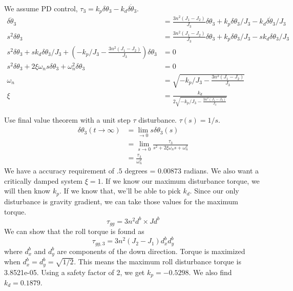 \documentclass[]{article}
\begin{document}
We assume PD control, $\tau_3 = k_p \delta \theta_3 - k_d \delta \dot{\theta}_3$. 
\begin{align}
	\delta \ddot{\theta}_3 & = \frac{3n^2(J_1 - J_2)}{J_3} \delta \theta_3 + k_p \delta \theta_3/J_3 - k_d \delta \dot{\theta}_3/J_3 \\
	s^2 \delta \theta_3 & = \frac{3n^2(J_1 - J_2)}{J_3} \delta \theta_3 + k_p \delta \theta_3/J_3 - s k_d \delta \theta_3/J_3 \\
	s^2 \delta \theta_3 + s k_d \delta \theta_3/J_3 + \left(-k_p/J_3 - \frac{3n^2(J_1 - J_2)}{J_3}\right) \delta \theta_3  & = 0 \\
	s^2 \delta \theta_3 + 2 \xi \omega_n s \delta \theta_3 + \omega_n^2 \delta \theta_3  & = 0 \\
	\omega_n & = \sqrt{-k_p/J_3 - \frac{3n^2(J_1 - J_2)}{J_3}} \\
	\xi & = \frac{k_d}{2 \sqrt{-k_p/J_3 - \frac{3n^2(J_1 - J_2)}{J_3}}}
\end{align}

Use final value theorem with a unit step $\tau$ disturbance. $\tau(s) = 1/s$.
\begin{align}
	\delta \theta_3 (t \rightarrow \infty) & = \lim_{\rightarrow 0} s \delta \theta_3(s) \\
	& = \lim_{s \rightarrow 0} \frac{\tau_3}{s^2 + 2\xi \omega_n s + \omega_n^2} \\
	& = \frac{\tau_3}{\omega_n^2}
\end{align}
We have a accuracy requirement of $.5$ degrees = $0.00873$ radians. We also want a critically damped system $\xi = 1$. If we know our maximum disturbance torque, we will then know $k_p$. If we know that, we'll be able to pick $k_d$. Since our only disturbance is gravity gradient, we can take those values for the maximum torque.
\begin{equation}
	\tau_{gg} = 3 n^2 d^b \times J d^b
\end{equation}
We can show that the roll torque is found as
\begin{equation}
	\tau_{gg,3} = 3n^2 (J_2 - J_1) d_x^b d_y^b
\end{equation}
where $d_x^b$ and $d_y^b$ are components of the down direction. Torque is maximized when $d_x^b = d_y^b = \sqrt{1/2}$. This means the maximum roll disturbance torque is 3.8521e-05. Using a safety factor of 2, we get $k_p = -0.5298$. We also find $k_d = 0.1879$.
\end{document}
